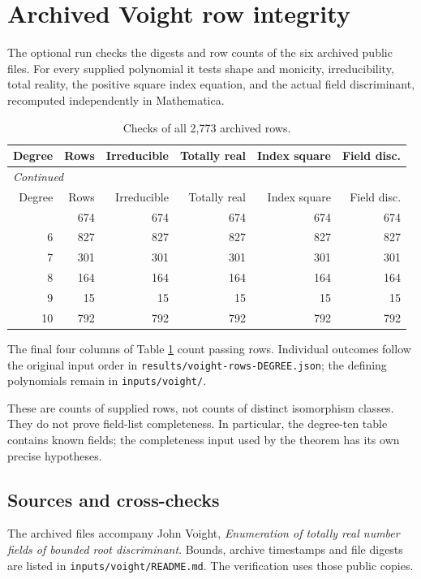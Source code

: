 \documentclass[12pt]{amsart}
\theoremstyle{remark}
\theoremstyle{definition}
\numberwithin{equation}{section}
\begin{document}
\section{Archived Voight row integrity}\label{sec:voight}
The optional run checks the digests and row counts of the six archived
public files. For every supplied polynomial it tests shape and monicity,
irreducibility, total reality, the positive square index equation, and the
actual field discriminant, recomputed independently in Mathematica.
\begingroup
\small
\begin{longtable}{rrrrrr}
\caption{Checks of all 2,773 archived rows.}\label{tab:voight}\\
\toprule
Degree & Rows & Irreducible & Totally real & Index square & Field disc. \\
\midrule
\endfirsthead
\multicolumn{6}{l}{\textit{Continued}}\\
\toprule
Degree & Rows & Irreducible & Totally real & Index square & Field disc. \\
\midrule
\endhead
\midrule
\endfoot
\bottomrule
\endlastfoot
5 & 674 & 674 & 674 & 674 & 674 \\
6 & 827 & 827 & 827 & 827 & 827 \\
7 & 301 & 301 & 301 & 301 & 301 \\
8 & 164 & 164 & 164 & 164 & 164 \\
9 & 15 & 15 & 15 & 15 & 15 \\
10 & 792 & 792 & 792 & 792 & 792 \\
\end{longtable}
\endgroup
The final four columns of Table \ref{tab:voight} count passing rows.
Individual outcomes follow the original input order in
\texttt{results/voight-rows-DEGREE.json}; the defining polynomials remain
in \texttt{inputs/voight/}.

These are counts of supplied rows, not counts of distinct isomorphism
classes. They do not prove field-list completeness. In particular, the
degree-ten table contains known fields; the completeness input used by the
theorem has its own precise hypotheses.

\subsection*{Sources and cross-checks}
The archived files accompany John Voight, \emph{Enumeration of totally real
number fields of bounded root discriminant}. Bounds, archive timestamps and
file digests are listed in \texttt{inputs/voight/README.md}. The verification
uses those public copies.
\end{document}
